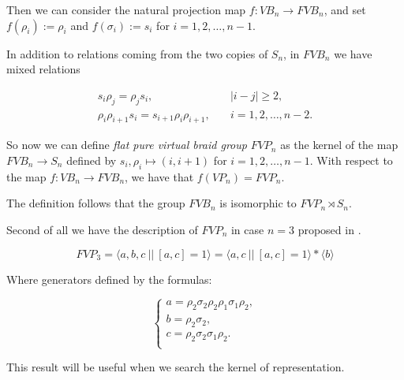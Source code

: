 \documentclass{article}
\begin{document}
Then we can consider the natural projection map $f:VB_n \rightarrow FVB_n$, and set $f(\rho_i):= \rho_i$ and $f(\sigma_i):= s_i$ for $i = 1, 2, \dots, n-1$. 



In addition to relations coming from the two copies of $S_n$, in $FVB_n$ we have mixed relations 

\begin{align*}

s_i\rho_j = \rho_js_i, &\quad |i-j| \ge 2,\\

\rho_i\rho_{i+1}s_i = s_{i+1}\rho_i\rho_{i+1}, &\quad i = 1, 2, \dots, n-2.

\end{align*}



So now we can define \textit{flat pure virtual braid group} $FVP_n$ as the kernel of the map  $FVB_n \to S_n$ defined by $s_i, \rho_i \mapsto (i, i+1)$ for $i = 1, 2, \dots, n-1$. With respect to the map $f:VB_n \to FVB_n$, we have that $f(VP_n) = FVP_n$. 



The definition follows that the group $FVB_n$ is isomorphic to $FVP_n\rtimes S_n$.



\vspace{6pt}Second of all we have the description of $FVP_n$ in case $n = 3$ proposed in \cite{BarBelDom}.

$$FVP_3 = \langle a, b, c ~|| ~ [a,c] = 1 \rangle  = \langle a, c~||~[a,c] = 1 \rangle * \langle b \rangle$$



Where generators defined by the formulas:

$$ 

\begin{cases}

a = \rho_2\sigma_2\rho_2\rho_1\sigma_1\rho_2, \\

b = \rho_2\sigma_2,\\

c = \rho_2\sigma_2\sigma_1\rho_2.\\

\end{cases}

$$



This result will be useful when we search the kernel of representation.
\end{document}
